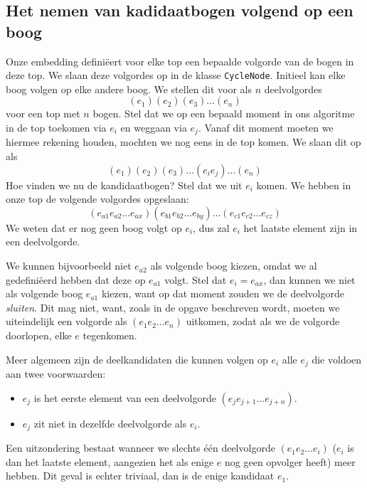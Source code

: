 \documentclass{article}
\begin{document}
\subsection{Het nemen van kadidaatbogen volgend op een boog}
\label{kandidaatbogen}
Onze embedding defini\"eert voor elke top een bepaalde volgorde van de bogen in
deze top. We slaan deze volgordes op in de klasse \verb#CycleNode#. Initieel kan
elke boog volgen op elke andere boog. We stellen dit voor als $n$ deelvolgordes
\begin{equation*}
(e_1) (e_2) (e_3) \dots (e_n)
\end{equation*}
voor een top met $n$ bogen. Stel dat we op een bepaald moment in ons algoritme
in de top toekomen via $e_i$ en weggaan via $e_j$. Vanaf dit moment moeten we
hiermee rekening houden, mochten we nog eens in de top komen. We slaan dit op
als
\begin{equation*}
(e_1) (e_2) (e_3) \dots (e_i e_j) \dots (e_n)
\end{equation*}
Hoe vinden we nu de kandidaatbogen? Stel dat we uit $e_i$ komen. We hebben in
onze top de volgende volgordes opgeslaan:
\begin{equation*}
(e_{a1} e_{a2} \dots e_{ax}) (e_{b1} e_{b2} \dots e_{by}) \dots (e_{c1} e_{c2} \dots e_{cz})
\end{equation*}
We weten dat er nog geen boog volgt op $e_i$, dus zal $e_i$ het laatste element
zijn in een deelvolgorde.
\newline

We kunnen bijvoorbeeld niet $e_{a2}$ als volgende boog kiezen, omdat we al
gedefini\"eerd hebben dat deze op $e_{a1}$ volgt. Stel dat $e_i = e_{ax}$,
dan kunnen we niet als volgende boog $e_{a1}$ kiezen, want op dat moment zouden
we de deelvolgorde \emph{sluiten}. Dit mag niet, want, zoals in de opgave
beschreven wordt, moeten we uiteindelijk een volgorde als $(e_1 e_2 \dots e_n)$
uitkomen, zodat als we de volgorde doorlopen, elke $e$ tegenkomen.
\newline

Meer algemeen zijn de deelkandidaten die kunnen volgen op $e_i$ alle $e_j$ die
voldoen aan twee voorwaarden:
\begin{itemize}
\item $e_j$ is het eerste element van een deelvolgorde
$(e_j e_{j+1} ... e_{j+n})$.
\item $e_j$ zit niet in dezelfde deelvolgorde als $e_i$.
\end{itemize}

Een uitzondering bestaat wanneer we slechts \'e\'en deelvolgorde 
$(e_1 e_2 \dots e_i)$ ($e_i$ is dan het laatste element, aangezien het als
enige $e$ nog geen opvolger heeft) meer hebben. Dit geval is echter triviaal,
dan is de enige kandidaat $e_1$.
\end{document}
